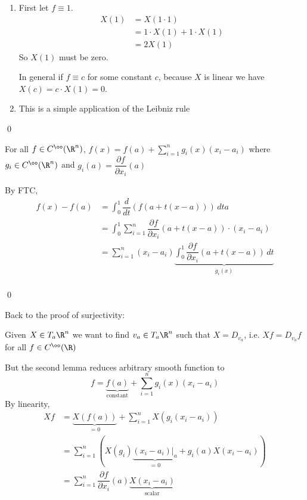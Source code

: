 \documentclass[x11names,reqno,14pt]{extarticle}
\newcommand{\pp}[2]{\dfrac{\partial #1}{\partial #2}}
\newcommand{\dd}[2]{\dfrac{d#1}{d#2}}
\begin{document}
\proof

\begin{enumerate}

\item First let $f\equiv1$. 
\begin{align*}
X(1) & = X(1\cdot 1) \\
	  & = 1\cdot X(1) + 1\cdot X(1) \\
	  & = 2X(1)
\end{align*}
So $X(1)$ must be zero. 

In general if $f\equiv c$ for some constant $c$, because $X$ is linear we have $X(c) = c\cdot X(1) = 0$. 

\item This is a simple application of the Leibniz rule

\end{enumerate}

\qed


For all $f \in C^\oo(\R^n)$, $f(x) = f(a) + \sum_{i=1}^ng_i(x)(x_i - a_i)$ where $g_i \in C^\oo(\R^n)$ and $g_i(a) = \pp{f}{x_i}(a)$

\proof

By FTC, 
\begin{align*}
f(x) - f(a) & = \int_0^1\dd{}{t}(f(a + t(x - a)))\,dt a \\
				& = \int_0^1\sum_{i=1}^n\pp{f}{x_i}(a + t(x - a))\cdot(x_i - a_i) \\
				& = \sum_{i=1}^n(x_i-a_i)\underbrace{\int_0^1\pp{f}{x_i}(a + t(x - a))\,dt}_{g_i(x)} \\
\end{align*}

\qed

Back to the proof of surjectivity:

Given $X \in T_a\R^n$ we want to find $v_a\in T_a\R^n$ such that $X = D_{v_a}$, i.e. $Xf = D_{v_a}f$ for all $f \in C^\oo(\R)$

But the second lemma reduces arbitrary smooth function to 
\[
f = \underbrace{f(a)}_{\text{constant}} + \sum_{i=1}^ng_i(x)(x_i - a_i)
\]
By linearity, 
\begin{align*}
Xf & = \underbrace{X(f(a))}_{=0} + \sum_{i=1}^nX(g_i(x_i -a_i)) \\
   & = \sum_{i=1}^n\left(X(g_i)\underbrace{(x_i-a_i)|_{a}}_{=0} + g_i(a)X(x_i-a_i)\right) \\
	& = \sum_{i=1}^n\pp{f}{x_i}(a)\underbrace{X(x_i - a_i)}_{\text{scalar}}
\end{align*}
\end{document}

